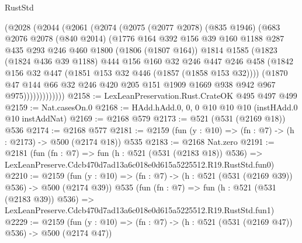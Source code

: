 \begin{lexlean}{RustStd}
\begin{coremodule}
            (@2028
              (@2044
                (@2061
                  (@2074
                    (@2075
                      (@2077 @2078)
                      (@835 @1946)
                      (@683
                        @2076
                        @2078
                        (@840 @2014)
                        (@1776
                          @164
                          @392
                          @156
                          @39
                          @160
                          @1188
                          @287
                          @435
                          @293
                          @246
                          @460
                          @1800
                          (@1806 (@1807 @164))
                          @1814
                          @1585
                          (@1823
                            (@1824 @436 @39 @1188)
                            @444
                            @156
                            @160
                            @32
                            @246
                            @447
                            @246
                            @458
                            (@1842 @156 @32 @447 (@1851 @153 @32 @446 (@1857 (@1858 @153 @32))))
                            (@1870
                              @47
                              @144
                              @66
                              @32
                              @246
                              @420
                              @205
                              @151
                              @1909
                              @1669
                              @938
                              @942
                              @967
                              @975)))))))))))))
@2158 := LexLeanPreservation.Rust.CrateOK @495 @497 @499
@2159 := Nat.casesOn.{0}
@2168 := HAdd.hAdd.{0, 0, 0} @10 @10 @10 (instHAdd.{0} @10 instAddNat)
@2169 := @2168 @579
@2173 := @521 (@531 (@2169 @18)) @536
@2174 := @2168 @577
@2181 := @2159 (fun (y : @10) => (fn : @7) -> (h : @2173) -> @500 (@2174 @18)) @535
@2183 := @2168 Nat.zero
@2191 := @2181
    (fun (fn : @7) =>
    fun (h : @521 (@531 (@2183 @18)) @536) =>
    LexLeanPreserve.Cdcb470d7ad13a6c018e0d615a5225512.R19.RustStd.fun0)
@2210 := @2159
    (fun (y : @10) => (fn : @7) -> (h : @521 (@531 (@2169 @39)) @536) -> @500 (@2174 @39))
    @535
    (fun (fn : @7) =>
    fun (h : @521 (@531 (@2183 @39)) @536) =>
    LexLeanPreserve.Cdcb470d7ad13a6c018e0d615a5225512.R19.RustStd.fun1)
@2229 := @2159
    (fun (y : @10) => (fn : @7) -> (h : @521 (@531 (@2169 @47)) @536) -> @500 (@2174 @47))

\end{coremodule}
\end{lexlean}
